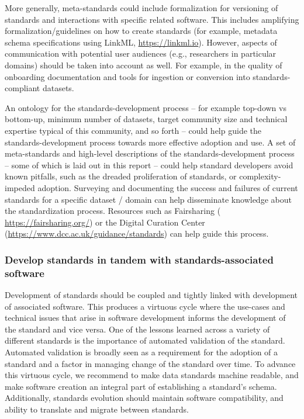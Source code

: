 \documentclass[
  number]{elsarticle}
\begin{document}
More generally, meta-standards could include formalization for
versioning of standards and interactions with specific related software.
This includes amplifying formalization/guidelines on how to create
standards (for example, metadata schema specifications using LinkML,
\url{https://linkml.io}). However, aspects of communication with
potential user audiences (e.g., researchers in particular domains)
should be taken into account as well. For example, in the quality of
onboarding documentation and tools for ingestion or conversion into
standards-compliant datasets.

An ontology for the standards-development process -- for example
top-down vs bottom-up, minimum number of datasets, target community size
and technical expertise typical of this community, and so forth -- could
help guide the standards-development process towards more effective
adoption and use. A set of meta-standards and high-level descriptions of
the standards-development process -- some of which is laid out in this
report -- could help standard developers avoid known pitfalls, such as
the dreaded proliferation of standards, or complexity-impeded adoption.
Surveying and documenting the success and failures of current standards
for a specific dataset / domain can help disseminate knowledge about the
standardization process. Resources such as Fairsharing (
\url{https://fairsharing.org/}) or the Digital Curation Center
(\url{https://www.dcc.ac.uk/guidance/standards}) can help guide this
process.

\subsubsection{Develop standards in tandem with standards-associated
software}\label{develop-standards-in-tandem-with-standards-associated-software}

Development of standards should be coupled and tightly linked with
development of associated software. This produces a virtuous cycle where
the use-cases and technical issues that arise in software development
informs the development of the standard and vice versa. One of the
lessons learned across a variety of different standards is the
importance of automated validation of the standard. Automated validation
is broadly seen as a requirement for the adoption of a standard and a
factor in managing change of the standard over time. To advance this
virtuous cycle, we recommend to make data standards machine readable,
and make software creation an integral part of establishing a standard's
schema. Additionally, standards evolution should maintain software
compatibility, and ability to translate and migrate between standards.
\end{document}
